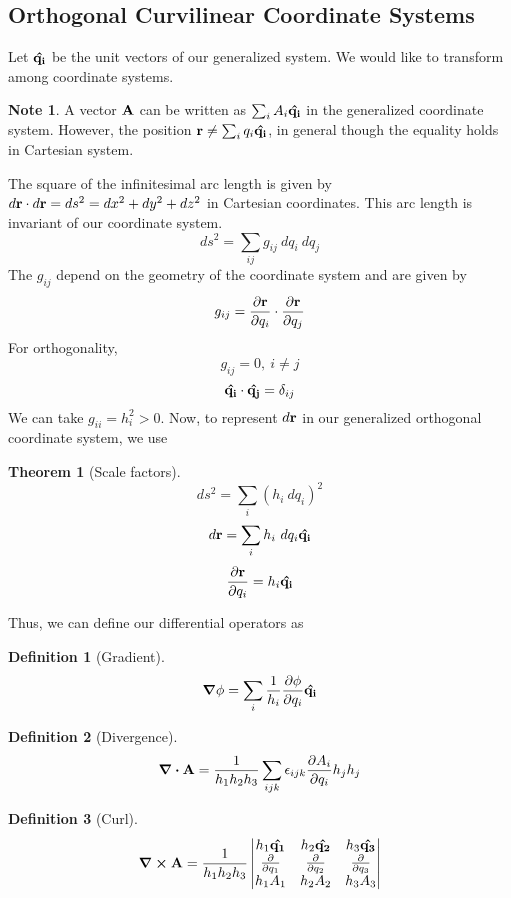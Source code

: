 \documentclass[10pt, a4paper]{extarticle}
\theoremstyle{definition}
\newtheorem{thm}{Theorem}
\newtheorem{defn}{Definition}
\newtheorem*{note*}{Note}
\begin{document}
\subsection{Orthogonal Curvilinear Coordinate Systems}
Let $\vu{q_i}$ be the unit vectors of our generalized system. We would like to transform among coordinate systems.
\begin{note*}
	A vector $\vb{A}$ can be written as $\sum_i A_i\vu{q_i}$ in the generalized coordinate system. However, the position $\vb{r}\neq \sum_i q_i\vu{q_i}$, in general though the equality holds in Cartesian system.
\end{note*}
The square of the infinitesimal arc length is given by $d\vb{r}\cdot d\vb{r}=ds^2=dx^2+dy^2+dz^2$ in Cartesian coordinates. This arc length is invariant of our coordinate system.
\[ds^2=\sum_{ij}g_{ij}\ dq_i\ dq_j\]
The $g_{ij}$ depend on the geometry of the coordinate system and are given by
\[g_{ij}=\pdv{\vb{r}}{q_i}\cdot\pdv{\vb{r}}{q_j}\]
For orthogonality,
\[g_{ij}=0,\ i\neq j\]\[\vu{q_i}\cdot\vu{q_j}=\delta_{ij}\]
We can take $g_{ii}=h_i^2>0$. Now, to represent $d\vb{r}$ in our generalized orthogonal coordinate system, we use
\begin{framed}
	\begin{thm}[Scale factors]
		\[ds^2=\sum_i(h_i\ dq_i)^2\]
		\[d\vb{r}=\sum_i h_i\ dq_i\vu{q_i}\]
		\[\pdv{\vb{r}}{q_i}=h_i\vu{q_i}\]
	\end{thm}
\end{framed}
Thus, we can define our differential operators as
\begin{framed}
	\begin{defn}[Gradient]
		\[\grad{\phi}=\sum_i\frac{1}{h_i}\pdv{\phi}{q_i}\vu{q_i}\]
	\end{defn}
	\begin{defn}[Divergence]
		\[\div{\vb{A}}=\frac{1}{h_1h_2h_3}\sum_{ijk}\epsilon_{ijk}\pdv{A_i}{q_i}h_jh_j\]
	\end{defn}
	\begin{defn}[Curl]
		\[\curl{\vb{A}}=\frac{1}{h_1h_2h_3}\left|
			\begin{matrix}
				h_1\vu{q_1} & h_2\vu{q_2} & h_3\vu{q_3} \\
				\pdv{}{q_1} & \pdv{}{q_2} & \pdv{}{q_3} \\
				h_1A_1      & h_2A_2      & h_3A_3
			\end{matrix}
			\right|\]
	\end{defn}
\end{framed}
\end{document}
